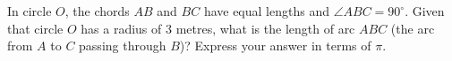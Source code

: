 In circle $O$, the chords $AB$ and $BC$ have equal lengths and $\angle ABC=90^\circ$. Given that circle $O$ has a radius of $3$ metres, what is the length of arc $ABC$ (the arc from $A$ to $C$ passing through $B$)? Express your answer in terms of $\pi$.
